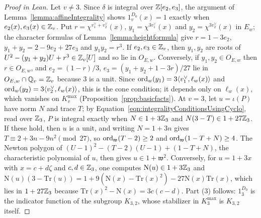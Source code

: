 \begin{proof}[Proof in Lean]

\leanok


Let $v\neq3$. Since $\delta$ is integral over $\mathbb{Z}[e_2,e_3]$, the argument of Lemma~\ref{lemma:affineIntegrality} shows $1_v^{D_0}(x)=1$ exactly when $e_2(x),e_3(x)\in\mathbb{Z}_v$. Put $r=\chi^{v_1^\vee+v_2^\vee}(x)$, $y_1=\chi^{3v_1^\vee}(x)$ and $y_2=\chi^{3v_2^\vee}(x)$ in $E_w$; the character formulas of Lemma~\ref{lemma:heightformula} give $r=1-3e_2$, $y_1+y_2=2-9e_2+27e_3$ and $y_1y_2=r^3$. If $e_2,e_3\in\mathbb{Z}_v$, then $y_1,y_2$ are roots of $U^2-(y_1+y_2)U+r^3\in\mathbb{Z}_v[U]$ and so lie in $O_{E,w}$. Conversely, if $y_1,y_2\in O_{E,w}$ then $r\in O_{E,w}$, and $e_2=(1-r)/3$, $e_3=(y_1+y_2+1-3r)/27$ lie in $O_{E,w}\cap\mathbb{Q}_v=\mathbb{Z}_v$ because $3$ is a unit. Since $\mathrm{ord}_w(y_1)=3\langle v_1^\vee,\ell_w(x)\rangle$ and $\mathrm{ord}_w(y_2)=3\langle v_2^\vee,\ell_w(x)\rangle$, this is the cone condition; it depends only on $\ell_w(x)$, which vanishes on $K_v^{\mathrm{max}}$ (Proposition~\ref{prop:basicfacts}). At $v=3$, let $u=\iota(P)$ have norm $N$ and trace $T$; by Equation~\ref{eqn:integralityConditionsUsingCyclo}, read over $\mathbb{Z}_3$, $P$ is integral exactly when $N\in1+3\mathbb{Z}_3$ and $N(3-T)\in1+27\mathbb{Z}_3$. If these hold, then $u$ is a unit, and writing $N=1+3n$ gives $T\equiv2+3n-9n^2\pmod{27}$, so $\mathrm{ord}_{\mathfrak w}(T-2)\geq2$ and $\mathrm{ord}_{\mathfrak w}(1-T+N)\geq4$. The Newton polygon of $(U-1)^2-(T-2)(U-1)+(1-T+N)$, the characteristic polynomial of $u$, then gives $u\in1+\mathfrak w^2$. Conversely, for $u=1+3x$ with $x=c+d\zeta$ and $c,d\in\mathbb{Z}_3$, one computes $\mathrm N(u)\in1+3\mathbb{Z}_3$ and $\mathrm N(u)(3-\mathrm{Tr}(u))=1+9(\mathrm N(x)-\mathrm{Tr}(x)^2)-27\mathrm N(x)\mathrm{Tr}(x)$, which lies in $1+27\mathbb{Z}_3$ because $\mathrm{Tr}(x)^2-\mathrm N(x)=3c(c-d)$. Part (3) follows: $1_3^{D_0}$ is the indicator function of the subgroup $K_{3,2}$, whose stabilizer in $K_3^{\mathrm{max}}$ is $K_{3,2}$ itself.

\end{proof}

